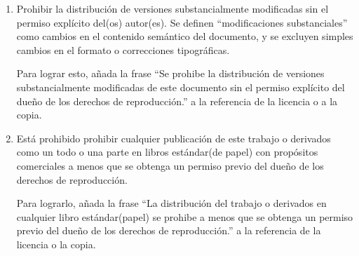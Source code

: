 \begin{enumerate}[A]
\item Prohibir la distribución de versiones substancialmente
  modificadas sin el permiso explícito del(os) autor(es).  Se definen
  ``modificaciones substanciales'' como cambios en el contenido
  semántico del documento, y se excluyen simples cambios en el formato
  o correcciones tipográficas.

  Para lograr esto, añada la frase ``Se prohibe la distribución de
  versiones substancialmente modificadas de este documento sin el
  permiso explícito del dueño de los derechos de reproducción.'' a la
  referencia de la licencia o a la copia.

\item Está prohibido prohibir cualquier publicación de este trabajo o
  derivados como un todo o una parte en libros estándar(de papel) con
  propósitos comerciales a menos que se obtenga un permiso previo del
  dueño de los derechos de reproducción.

  Para lograrlo, añada la frase ``La distribución del trabajo o
  derivados en cualquier libro estándar(papel) se prohibe a menos que
  se obtenga un permiso previo del dueño de los derechos de
  reproducción.'' a la referencia de la licencia o la copia.
\end{enumerate}

